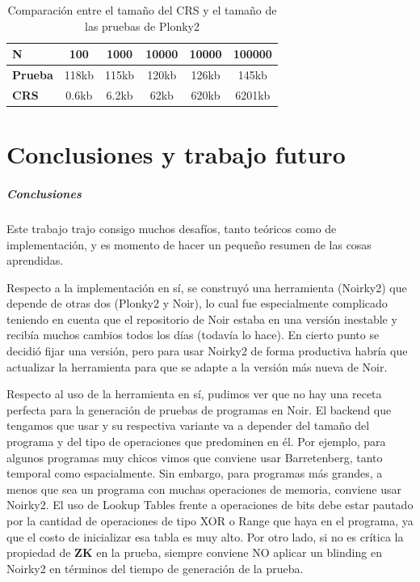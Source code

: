 \documentclass[11pt,a4paper]{tesis}
\begin{document}
\begin{table}[h!]
\centering
\begin{tabular}{|l|c|c|c|c|c|}
\hline
\textbf{N} & 100 & 1000 & 10000 & 10000 & 100000\\ \hline
\textbf{Prueba} & 118kb& 115kb& 120kb& 126kb& 145kb\\ \hline
\textbf{CRS} & 0.6kb& 6.2kb& 62kb& 620kb& 6201kb \\ \hline
\end{tabular}
\caption{Comparación entre el tamaño del CRS y el tamaño de las pruebas de Plonky2}
\label{tab:CRS_vs_prueba}
\end{table}

\part{Conclusiones y trabajo futuro}

\subsubsection{Conclusiones}

Este trabajo trajo consigo muchos desafíos, tanto teóricos como de implementación, y es momento de hacer un pequeño resumen de las cosas aprendidas. 

Respecto a la implementación en sí, se construyó una herramienta (Noirky2) que depende de otras dos (Plonky2 y Noir), lo cual fue especialmente complicado teniendo en cuenta que el repositorio de Noir estaba en una versión inestable y recibía muchos cambios todos los días (todavía lo hace). En cierto punto se decidió fijar una versión, pero para usar Noirky2 de forma productiva habría que actualizar la herramienta para que se adapte a la versión más nueva de Noir.

Respecto al uso de la herramienta en sí, pudimos ver que no hay una receta perfecta para la generación de pruebas de programas en Noir. El backend que tengamos que usar y su respectiva variante va a depender del tamaño del programa y del tipo de operaciones que predominen en él. Por ejemplo, para algunos programas muy chicos vimos que conviene usar Barretenberg, tanto temporal como espacialmente. Sin embargo, para programas más grandes, a menos que sea un programa con muchas operaciones de memoria, conviene usar Noirky2. El uso de Lookup Tables frente a operaciones de bits debe estar pautado por la cantidad de operaciones de tipo XOR o Range que haya en el programa, ya que el costo de inicializar esa tabla es muy alto. Por otro lado, si no es crítica la propiedad de \textbf{ZK} en la prueba, siempre conviene NO aplicar un blinding en Noirky2 en términos del tiempo de generación de la prueba.
\end{document}

